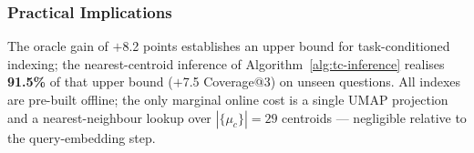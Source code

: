 \subsubsection{Practical Implications}
\label{sec:indexing-practical}

The oracle gain of $+$8.2 points establishes an upper bound for task-conditioned
indexing; the nearest-centroid inference of Algorithm~\ref{alg:tc-inference}
realises \textbf{91.5\%} of that upper bound ($+$7.5 Coverage@3) on unseen
questions.
All indexes are pre-built offline; the only marginal online cost is a single
UMAP projection and a nearest-neighbour lookup over $|\{\mu_c\}| = 29$ centroids
— negligible relative to the query-embedding step.




